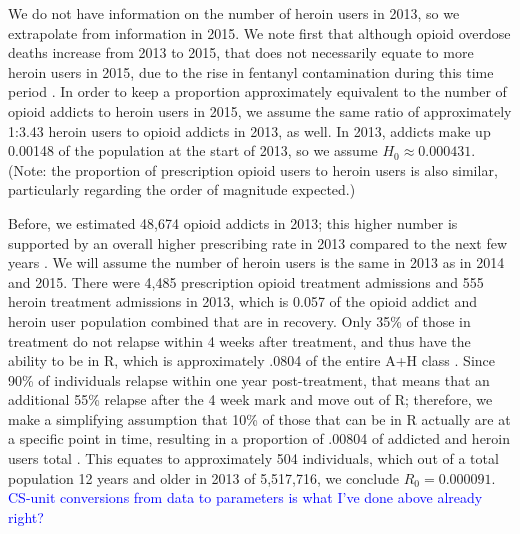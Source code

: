 \documentclass[12pt]{article}
\begin{document}
We do not have information on the number of heroin users in 2013, so we extrapolate from information in 2015. We note first that although opioid overdose deaths increase from 2013 to 2015, that does not necessarily equate to more heroin users in 2015, due to the rise in fentanyl contamination during this time period \cite{CDC4}. In order to keep a proportion approximately equivalent to the number of opioid addicts to heroin users in 2015, we assume the same ratio of approximately 1:3.43 heroin users to opioid addicts in 2013, as well. In 2013, addicts make up 0.00148 of the population at the start of 2013, so we assume $H_0 \approx 0.000431.$ (Note: the proportion of prescription opioid users to heroin users is also similar, particularly regarding the order of magnitude expected.) 

Before, we estimated 48,674 opioid addicts in 2013; this higher number is supported by an overall higher prescribing rate in 2013 compared to the next few years \cite{CDC7}.
We will assume the number of heroin users is the same in 2013 as in 2014 and 2015. There were 4,485 prescription opioid treatment admissions and 555 heroin treatment admissions in 2013, which is 0.057 of the opioid addict and heroin user population combined that are in recovery. Only 35\% of those in treatment do not relapse within 4 weeks after treatment, and thus have the ability to be in R, which is approximately .0804 of the entire A+H class \cite{Bailey}.
Since 90\% of individuals relapse within one year post-treatment, that means that an additional 55\% relapse after the 4 week mark and move out of R; therefore, we make a simplifying assumption that 10\% of those that can be in R actually are at a specific point in time, resulting in a proportion of .00804 of addicted and heroin users total \cite{Bailey}. This equates to approximately 504 individuals, which out of a total population 12 years and older in 2013 of 5,517,716, we conclude $R_0=0.000091.$ \\


\pagebreak
\textcolor{blue}{CS-unit conversions from data to parameters is what I've done above already right?} \\
\end{document}
